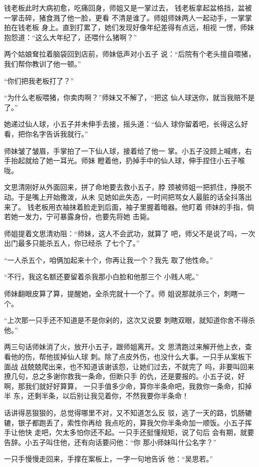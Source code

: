 钱老板此时大病初愈，吃痛回身，师姐又是一掌过去，
钱老板拿起盆格挡，盆被一掌击碎，猪食溅了他一脸，更看
不清是谁了。师姐师妹两人一起动手，一掌掌拍在钱老板
身上。直到打累了，她们发现好像年纪差得有点远，相视
一愣，师妹抱怨道：“这么大年纪了，还喂什么猪啊？”

两个姑娘耷拉着脑袋回到店前，师妹低声对小五子
说：“后院有个老头擅自喂猪，我们帮你教训了他一顿。”

“你们把我老板打了？”

“为什么老板喂猪，你卖肉啊？”师妹又不解了，“把这
仙人球送你，就当我赔不是了。”

她递过仙人球，小五子并未伸手去接，摇头道：“仙人
球你留着吧，长得这么好看，把你名字告诉我就行。”

师妹皱了皱眉，手掌拍了一下仙人球，接着给了他一
掌。小五子没顾上喊疼，右手抬起就给了她一耳光。师妹
瞪着他，扔掉手中的仙人球，伸手捏住小五子喉咙。

文思清刚好从外面回来，拼了命地要去救小五子，脖
颈被师姐一把抓住，挣脱不动。于是嘴上开始撒泼，从未
见她如此失态，一时间把骂女人最脏的话全抖落出来了。
钱老板用衣袖抹着脸走到后面，袖子里握着暗器。他盯着
师妹的手指，倘若她一发力，宁可暴露身份，也要先将她
击毙。

师姐提着文思清劝阻：“师妹，这人不会武功，就算了
吧，师父不是说了吗，一次出门最多只能杀五人，你已经杀
了七个了。”

“一人杀五个，咱俩加起来十个，你再让我一个？我先
取了他性命。”

“不行，我这名额还要留着杀我那小白脸和他那三个
小贱人呢。”

师妹翻眼皮算了算，提醒她，全杀完就十一个了。师
姐说那就杀三个，刺瞎一个。

“上次那一只手还不知道是不是你剁的，这次又说要
刺瞎双眼，就知道你舍不得杀他。”

两三句话师妹消了火，放开小五子，跟师姐离开。文
思清跑过来解开他上衣，查看他的伤，帮他拔掉仙人球
刺。除了点皮外伤，也没什么大事。一只手从案板下面战
战兢兢爬出来，也不知道该谢该怨，让她们过去，不就完了
吗，非要叫回来撩几句，总之多谢你救我一条命，但断只手
的仇，还是要报的。小五子说，好啊，那我们就好好算算，
一只手值多少命，算你半条命吧，我救你一条命，扣掉半
东，还剩半条，以后别让我见着你，不然我要你半条命！

话讲得恶狠狠的，总觉得哪里不对，又不知道怎么反
驳，逃了一天的路，饥肠辘辘，银子都跑丢了，索性你再给
我点吃的，算我欠你半条命加一顺饭。小五子挥手让他快
走吧，欠太多怕你还不起。一只手还挺懂规矩，说了句后
会有期，就要告辞。小五子叫住他，还有向话要问他：“你
那小师妹叫什公名字？”

一只手慢慢走回来，手撑在案板上，一字一句地告诉
他：“吴思若。”

